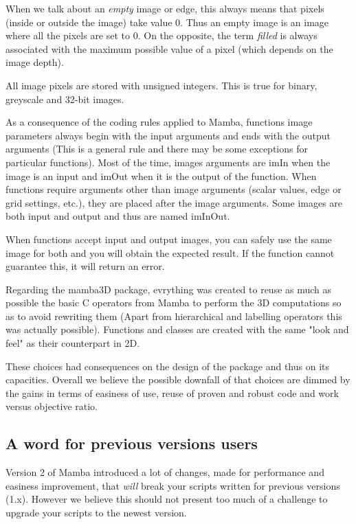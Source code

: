 \documentclass[a4paper,10pt,oneside]{article}
\begin{document}
When we talk about an \textit{empty} image or edge, this always means that pixels 
(inside or outside the image) take value 0. Thus an empty
image is an image where all the pixels are set to 0. On the opposite, the term 
\textit{filled} is always associated with the maximum possible value of a pixel (which
depends on the image depth).

All image pixels are stored with unsigned integers. This is true for binary,
greyscale and 32-bit images.

As a consequence of the coding rules applied to Mamba, functions image parameters
always begin with the input arguments and ends with the output arguments (This 
is a general rule and there may be some exceptions for particular functions).
Most of the time, images arguments are imIn when the image is an input and imOut
when it is the output of the function. When functions require arguments other than 
image arguments (scalar values, edge or grid settings, etc.), they are placed after 
the image arguments. Some images are both input and output and thus are named
imInOut.

When functions accept input and output images, you can safely use the same image
for both and you will obtain the expected result. If the function cannot 
guarantee this, it will return an error.

Regarding the mamba3D package, evrything was created to reuse as much as
possible the basic C operators from Mamba to perform the 3D computations so
as to avoid rewriting them (Apart from hierarchical and labelling operators
this was actually possible). Functions and classes are created with the same
"look and feel" as their counterpart in 2D.

These choices had consequences on the design of the package and thus on its
capacities. Overall we believe the possible downfall of that choices are
dimmed by the gains in terms of easiness of use, reuse of proven and robust
code and work versus objective ratio.

\subsection{A word for previous versions users}
\label{cha:change_mamba2}

Version 2 of Mamba introduced a lot of changes, made for performance and
easiness improvement, that \emph{will} break your scripts written for previous
versions (1.x). However we believe this should not present too much of a
challenge to upgrade your scripts to the newest version.
\end{document}
